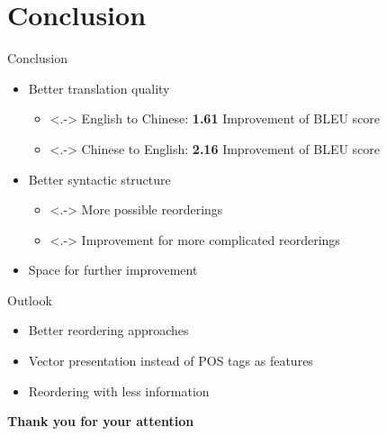 \documentclass[18pt]{beamer}
\begin{document}
\section{Conclusion}
\begin{frame}{Conclusion}
\begin{itemize}[<+->]
\item\alert<1>{Better translation quality}
\begin{itemize}
\item<.-> English to Chinese: \protect\textbf{1.61} Improvement of BLEU score
\item<.-> Chinese to English: \protect\textbf{2.16} Improvement of BLEU score
\end{itemize}
\item\alert<2>{Better syntactic structure}
\begin{itemize}
\item<.-> More possible reorderings
\item<.-> Improvement for more complicated reorderings
\end{itemize}
\item\alert<3>{Space for further improvement}
\end{itemize}
\end{frame}

\begin{frame}{Outlook}
\begin{itemize}[<+-| alert@+>]
\item Better reordering approaches
\item Vector presentation instead of POS tags as features
\item Reordering with less information
\end{itemize}
\end{frame}


\begin{frame}{\vphantom{A}}
\centering
{\LARGE \textbf{Thank you for your attention}}
\end{frame}

\appendix
\beginbackup
\end{document}

